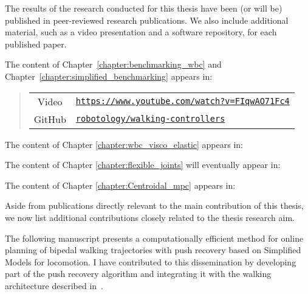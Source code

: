 The results of the research conducted for this thesis have been (or will be) published in peer-reviewed research publications. We also include additional material, such as a video presentation and a software repository, for each published paper. 
\par
The content of Chapter~\ref{chapter:benchmarking_wbc} and Chapter~\ref{chapter:simplified_benchmarking} appears in:
\begin{leftbar}
	\begin{quote}%
		 \vspace{5mm}\newline 
		 \vspace{5mm} \newline
		\begin{tabular}{c p{10.0cm}}
			     Video & \href{https://www.youtube.com/watch?v=FIqwAO71Fc4}{\texttt{https://www.youtube.com/watch?v=FIqwAO71Fc4}} \\
			     GitHub &  \href{https://github.com/robotology/walking-controllers}{\texttt{robotology/walking-controllers}} 
		\end{tabular}
	\end{quote}
\end{leftbar}
\vspace{5mm}

\noindent The content of Chapter \ref{chapter:wbc_visco_elastic} appears in:
\vspace{5mm}

\noindent The content of Chapter \ref{chapter:flexible_joints} will eventually appear in:

\noindent The content of Chapter \ref{chapter:Centroidal_mpc} appears in:
\vspace{5mm}


Aside from publications directly relevant to the main contribution of this thesis, we now list additional contributions closely related to the thesis research aim.
\par
The following manuscript presents a computationally efficient method for online planning of bipedal walking trajectories with push recovery based on Simplified Models for locomotion. I have contributed to this dissemination by developing part of the push recovery algorithm and integrating it with the walking architecture described in~\citep{Romualdi2020ARobots}.

